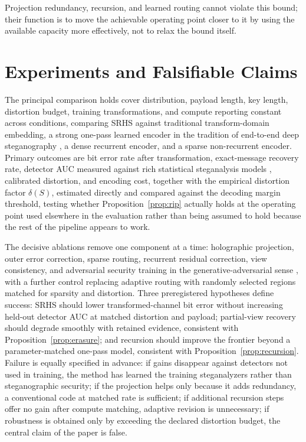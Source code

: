 Projection redundancy, recursion, and learned routing cannot violate this bound; their function is to move the achievable operating point closer to it by using the available capacity more effectively, not to relax the bound itself.

\section{Experiments and Falsifiable Claims}

The principal comparison holds cover distribution, payload length, key length, distortion budget, training transformations, and compute reporting constant across conditions, comparing SRHS against traditional transform-domain embedding, a strong one-pass learned encoder in the tradition of end-to-end deep steganography \cite{baluja2017}, a dense recurrent encoder, and a sparse non-recurrent encoder. Primary outcomes are bit error rate after transformation, exact-message recovery rate, detector AUC measured against rich statistical steganalysis models \cite{fridrich2012}, calibrated distortion, and encoding cost, together with the empirical distortion factor $\delta(S)$, estimated directly and compared against the decoding margin threshold, testing whether Proposition~\ref{prop:rip} actually holds at the operating point used elsewhere in the evaluation rather than being assumed to hold because the rest of the pipeline appears to work.

The decisive ablations remove one component at a time: holographic projection, outer error correction, sparse routing, recurrent residual correction, view consistency, and adversarial security training in the generative-adversarial sense \cite{goodfellow2014}, with a further control replacing adaptive routing with randomly selected regions matched for sparsity and distortion. Three preregistered hypotheses define success: SRHS should lower transformed-channel bit error without increasing held-out detector AUC at matched distortion and payload; partial-view recovery should degrade smoothly with retained evidence, consistent with Proposition~\ref{prop:erasure}; and recursion should improve the frontier beyond a parameter-matched one-pass model, consistent with Proposition~\ref{prop:recursion}. Failure is equally specified in advance: if gains disappear against detectors not used in training, the method has learned the training steganalyzers rather than steganographic security; if the projection helps only because it adds redundancy, a conventional code at matched rate is sufficient; if additional recursion steps offer no gain after compute matching, adaptive revision is unnecessary; if robustness is obtained only by exceeding the declared distortion budget, the central claim of the paper is false.


